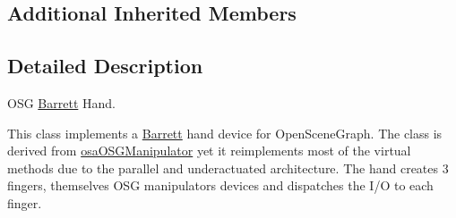 \subsection*{Additional Inherited Members}


\subsection{Detailed Description}
O\-S\-G \hyperlink{struct_barrett}{Barrett} Hand. 

This class implements a \hyperlink{struct_barrett}{Barrett} hand device for Open\-Scene\-Graph. The class is derived from \hyperlink{classosa_o_s_g_manipulator}{osa\-O\-S\-G\-Manipulator} yet it reimplements most of the virtual methods due to the parallel and underactuated architecture. The hand creates 3 fingers, themselves O\-S\-G manipulators devices and dispatches the I/\-O to each finger. 


